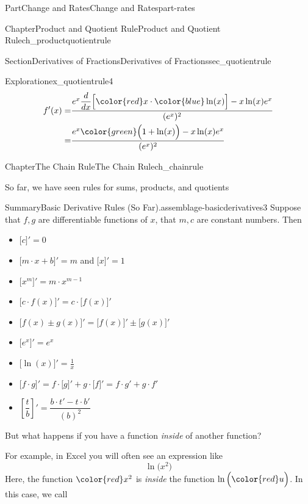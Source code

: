 \documentclass{tufte-book}
\numberwithin{equation}{chapter}
\newcommand{\red}[1]{   {\color{red}   #1}   }
\newcommand{\blue}[1]{  {\color{blue}  #1}  }
\newcommand{\green}[1]{ {\color{green} #1} }
\newcommand{\ddx}[1]{ \dfrac{d}{dx} \Big[ #1 \Big]  }
\newcommand{\D}[1]{ \Big[ #1 \Big]'  }
\newcommand{\amp}{&}
\begin{document}
\begin{partptx}{Part}{Change and Rates}{}{Change and Rates}{}{}{part-rates}
\begin{chapterptx}{Chapter}{Product and Quotient Rule}{}{Product and Quotient Rule}{}{}{ch_productquotientrule}
\begin{sectionptx}{Section}{Derivatives of Fractions}{}{Derivatives of Fractions}{}{}{sec_quotientrule}
\begin{exploration}{Exploration}{}{ex_quotientrule4}
\begin{align*}
f'(x) = \amp \dfrac{ e^x  \ddx{ \red{x}\cdot \blue{\ln(x)} }  -  x\ln(x) e^x }{( e^x )^2}\\
= \amp \dfrac{ e^x  \green{\Big(1 + \ln(x)\Big)}  -  x\ln(x) e^x }{( e^x )^2}
\end{align*}
%
\end{exploration}%
\end{sectionptx}
\end{chapterptx}
%
\typeout{************************************************}
\typeout{************************************************}
%
\begin{chapterptx}{Chapter}{The Chain Rule}{}{The Chain Rule}{}{}{ch_chainrule}
\renewcommand*{\chaptername}{Chapter}
\begin{introduction}{}%
So far, we have seen rules for sums, products, and quotients \begin{assemblage}{Summary}{Basic Derivative Rules (So Far).}{assemblage-basicderivatives3}%
Suppose that \(f,g\) are differentiable functions of \(x\), that \(m,c\) are constant numbers.  Then%
\begin{itemize}[label=\textbullet]
\item{}\(\displaystyle \D{c}=0\)%
\item{}\(\D{m\cdot x+b}=m\) and \(\D{x} = 1\)%
\item{}\(\displaystyle \D{x^m}=m\cdot x^{m-1}\)%
\item{}\(\displaystyle \D{ c\cdot f(x)}=c\cdot \D{f(x)}\)%
\item{}\(\displaystyle \D{f(x) \pm g(x)} = \D{f(x)} \pm \D{g(x)}\)%
\item{}\(\displaystyle \D{ e^x } = e^x \)%
\item{}\(\displaystyle \D{ \ln(x) } = \frac{1}{x}\)%
\item{}\(\displaystyle \Big[f\cdot g\Big]' = f\cdot \Big[g\Big]' + g\cdot \Big[f\Big]' = f\cdot g' + g\cdot f' \)%
\item{}\(\displaystyle \left[\dfrac{t}{b}\right]' = \dfrac{b\cdot t' - t\cdot b'}{(b)^2} \)%
\end{itemize}
%
\end{assemblage}
%
\par
But what happens if you have a function \emph{inside} of another function?%
\par
For example, in Excel you will often see an expression like%
\begin{equation*}
\ln\Big( x^2 \Big)
\end{equation*}
Here, the function \(\red{x^2}\) is \emph{inside} the function \(\ln\Big(\red{u}\Big)\). In this case, we call%

\end{introduction}
\end{chapterptx}
\end{partptx}
\end{document}
